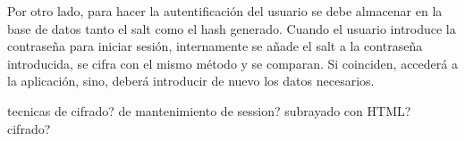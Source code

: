 Por otro lado, para hacer la autentificación del usuario se debe almacenar en la base de datos tanto el salt como el hash generado. Cuando el usuario introduce la contraseña para iniciar sesión, internamente se añade el salt a la contraseña introducida, se cifra con el mismo método y se comparan. Si coinciden, accederá a la aplicación, sino, deberá introducir de nuevo los datos necesarios.

tecnicas de cifrado? 
de mantenimiento de session?
subrayado con HTML?
cifrado?
